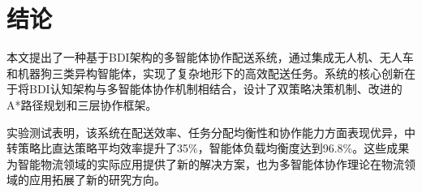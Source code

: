 \documentclass[12pt,a4paper]{article}
\begin{document}
\section{结论}

本文提出了一种基于BDI架构的多智能体协作配送系统，通过集成无人机、无人车和机器狗三类异构智能体，实现了复杂地形下的高效配送任务。系统的核心创新在于将BDI认知架构与多智能体协作机制相结合，设计了双策略决策机制、改进的A*路径规划和三层协作框架。

实验测试表明，该系统在配送效率、任务分配均衡性和协作能力方面表现优异，中转策略比直达策略平均效率提升了35\%，智能体负载均衡度达到96.8\%。这些成果为智能物流领域的实际应用提供了新的解决方案，也为多智能体协作理论在物流领域的应用拓展了新的研究方向。



\end{document}
